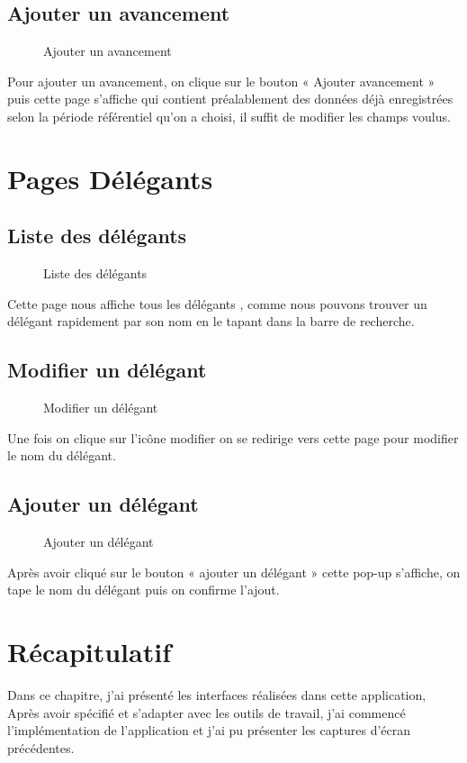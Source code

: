 \subsection{Ajouter un avancement}
\begin{figure}[H]
    \begin{center}
        \caption{Ajouter un avancement}
    \end{center}
\end{figure}
Pour ajouter un avancement, on clique sur le bouton « Ajouter avancement » puis cette page s'affiche qui contient préalablement des données déjà enregistrées selon la période référentiel qu'on a choisi, il suffit de modifier les champs voulus.
\section{Pages Délégants}
\subsection{Liste des délégants}
\begin{figure}[H]
    \begin{center}
        \caption{Liste des délégants}
    \end{center}
\end{figure}
Cette page nous affiche tous les délégants , comme nous pouvons trouver un délégant rapidement par son nom en le tapant dans la barre de recherche.
\subsection{Modifier un délégant}
\begin{figure}[H]
    \begin{center}
        \caption{Modifier un délégant}
    \end{center}
\end{figure}
Une fois on clique sur l'icône modifier on se redirige vers cette page pour modifier le nom du délégant.
\subsection{Ajouter un délégant}
\begin{figure}[H]
    \begin{center}
        \caption{Ajouter un délégant}
    \end{center}
\end{figure}
Après avoir cliqué sur le bouton « ajouter un délégant » cette pop-up s'affiche, on tape le nom du délégant puis on confirme l'ajout.

\section{Récapitulatif}

Dans ce chapitre, j'ai présenté les interfaces réalisées dans cette application,
Après avoir spécifié et s'adapter avec les outils de travail, j'ai commencé l'implémentation de
l’application et j'ai pu présenter les captures d’écran précédentes.